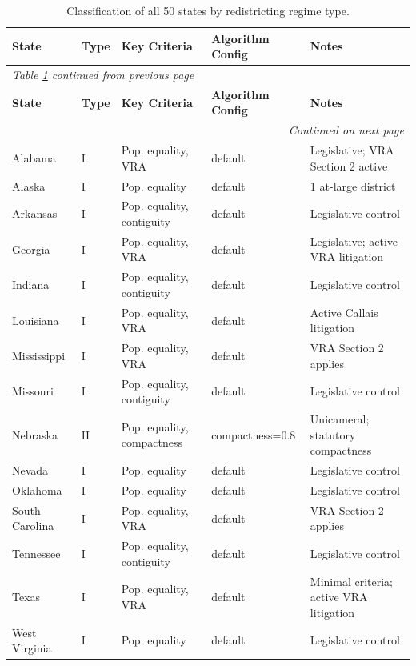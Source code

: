 \begin{landscape}
\begin{longtable}{lllll}
\caption{Classification of all 50 states by redistricting regime type.}
\label{tab:classification}\\
\toprule
\textbf{State} & \textbf{Type} & \textbf{Key Criteria} & \textbf{Algorithm Config} & \textbf{Notes}\\
\midrule
\endfirsthead
\multicolumn{5}{l}{\small\textit{Table \ref{tab:classification} continued from previous page}}\\
\toprule
\textbf{State} & \textbf{Type} & \textbf{Key Criteria} & \textbf{Algorithm Config} & \textbf{Notes}\\
\midrule
\endhead
\midrule
\multicolumn{5}{r}{\small\textit{Continued on next page}}\\
\endfoot
\bottomrule
\endlastfoot
Alabama & I & Pop. equality, VRA & default & Legislative; VRA Section 2 active\\
Alaska & I & Pop. equality & default & 1 at-large district\\
Arkansas & I & Pop. equality, contiguity & default & Legislative control\\
Georgia & I & Pop. equality, VRA & default & Legislative; active VRA litigation\\
Indiana & I & Pop. equality, contiguity & default & Legislative control\\
Louisiana & I & Pop. equality, VRA & default & Active Callais litigation\\
Mississippi & I & Pop. equality, VRA & default & VRA Section 2 applies\\
Missouri & I & Pop. equality, contiguity & default & Legislative control\\
Nebraska & II & Pop. equality, compactness & compactness=0.8 & Unicameral; statutory compactness\\
Nevada & I & Pop. equality & default & Legislative control\\
Oklahoma & I & Pop. equality & default & Legislative control\\
South Carolina & I & Pop. equality, VRA & default & VRA Section 2 applies\\
Tennessee & I & Pop. equality, contiguity & default & Legislative control\\
Texas & I & Pop. equality, VRA & default & Minimal criteria; active VRA litigation\\
West Virginia & I & Pop. equality & default & Legislative control\\

\end{longtable}
\end{landscape}
